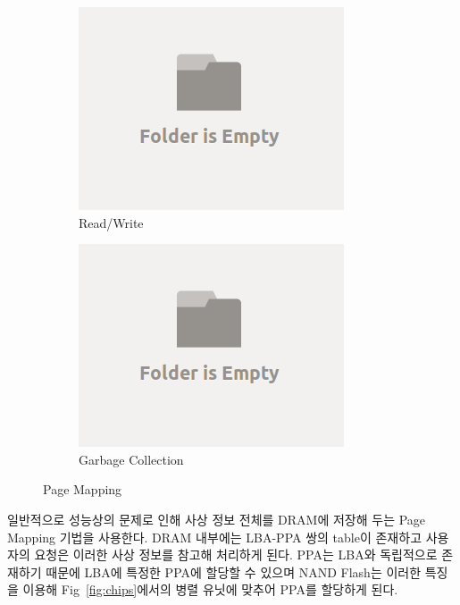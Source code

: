 \documentclass[conference]{IEEEtran}
\begin{document}
\begin{figure}[h]
	\centering
	\begin{subfigure}[b]{0.2\textwidth}	
		\includegraphics[width=\linewidth]{image/bg.png}
		\caption{Read/Write} \label{fig:PM}
	\end{subfigure}
	\begin{subfigure}[b]{0.2\textwidth}	
		\includegraphics[width=\linewidth]{image/bg.png}
		\caption{Garbage Collection} \label{fig:GC}
	\end{subfigure}
	\caption{Page Mapping}
\end{figure}

일반적으로 성능상의 문제로 인해 사상 정보 전체를 DRAM에 저장해 두는 Page Mapping 기법을 사용한다.
DRAM 내부에는 LBA-PPA 쌍의 table이 존재하고 사용자의 요청은 이러한 사상 정보를 참고해 처리하게 된다.
PPA는 LBA와 독립적으로 존재하기 때문에 LBA에 특정한 PPA에 할당할 수 있으며 NAND Flash는 이러한 특징을
이용해 Fig~\ref{fig:chips}에서의 병렬 유닛에 맞추어 PPA를 할당하게 된다.\par
\end{document}
